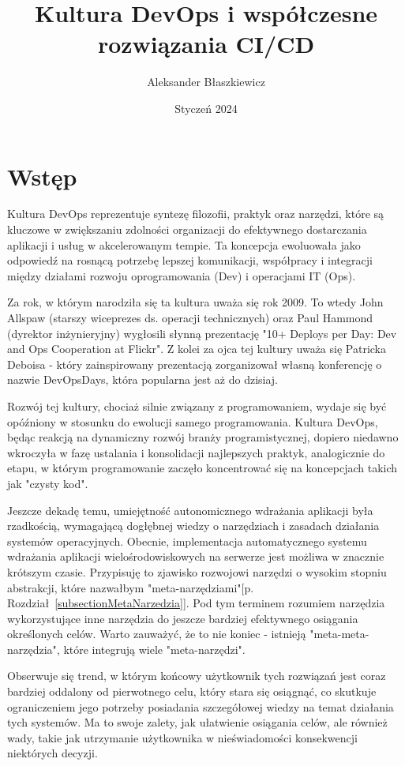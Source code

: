 \documentclass{article}
\title{Kultura DevOps i współczesne rozwiązania CI/CD}
\author{Aleksander Błaszkiewicz}
\date{Styczeń 2024}
\newcommand{\chapref}[1]{[p. Rozdział~\ref{#1}]}
\begin{document}
\maketitle
\newpage
\tableofcontents
\newpage

\section{Wstęp}
Kultura DevOps reprezentuje syntezę filozofii, praktyk oraz narzędzi, które są kluczowe w zwiększaniu zdolności organizacji do efektywnego dostarczania aplikacji i usług w akcelerowanym tempie. Ta koncepcja ewoluowała jako odpowiedź na rosnącą potrzebę lepszej komunikacji, współpracy i integracji między działami rozwoju oprogramowania (Dev) i operacjami IT (Ops).

Za rok, w którym narodziła się ta kultura uważa się rok 2009. To wtedy John Allspaw (starszy wiceprezes ds. operacji technicznych) oraz Paul Hammond (dyrektor inżynieryjny) wygłosili słynną prezentację "10+ Deploys per Day: Dev and Ops Cooperation at Flickr"\cite{flickr}. Z kolei za ojca tej kultury uważa się Patricka Deboisa - który zainspirowany prezentacją zorganizował własną konferencję o nazwie DevOpsDays, która popularna jest aż do dzisiaj.

Rozwój tej kultury, chociaż silnie związany z programowaniem, wydaje się być opóźniony w stosunku do ewolucji samego programowania. Kultura DevOps, będąc reakcją na dynamiczny rozwój branży programistycznej, dopiero niedawno wkroczyła w fazę ustalania i konsolidacji najlepszych praktyk, analogicznie do etapu, w którym programowanie zaczęło koncentrować się na koncepcjach takich jak "czysty kod".\cite{stateOfDevops}

Jeszcze dekadę temu, umiejętność autonomicznego wdrażania aplikacji była rzadkością, wymagającą dogłębnej wiedzy o narzędziach i zasadach działania systemów operacyjnych. Obecnie, implementacja automatycznego systemu wdrażania aplikacji wielośrodowiskowych na serwerze jest możliwa w znacznie krótszym czasie. Przypisuję to zjawisko rozwojowi narzędzi o wysokim stopniu abstrakcji, które nazwałbym "meta-narzędziami"\chapref{subsectionMetaNarzedzia}. Pod tym terminem rozumiem narzędzia wykorzystujące inne narzędzia do jeszcze bardziej efektywnego osiągania określonych celów. Warto zauważyć, że to nie koniec - istnieją "meta-meta-narzędzia", które integrują wiele "meta-narzędzi".

Obserwuje się trend, w którym końcowy użytkownik tych rozwiązań jest coraz bardziej oddalony od pierwotnego celu, który stara się osiągnąć, co skutkuje ograniczeniem jego potrzeby posiadania szczegółowej wiedzy na temat działania tych systemów. Ma to swoje zalety, jak ułatwienie osiągania celów, ale również wady, takie jak utrzymanie użytkownika w nieświadomości konsekwencji niektórych decyzji. \cite{devOpsHandbook}
\end{document}
